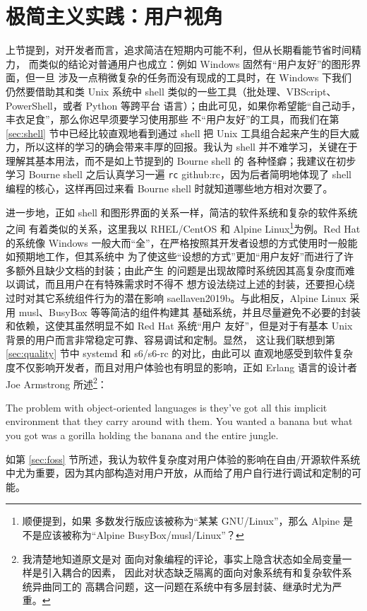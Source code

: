 \section{极简主义实践：用户视角}\label{sec:user}

上节提到，对开发者而言，追求简洁在短期内可能不利，但从长期看能节省时间精力，
而类似的结论对普通用户也成立：例如 Windows 固然有“用户友好”的图形界面，但一旦
涉及一点稍微复杂的任务而没有现成的工具时，在 Windows 下我们仍然要借助其和类 Unix
系统中 shell 类似的一些工具（批处理、VBScript、PowerShell，或者 Python 等跨平台
语言）；由此可见，如果你希望能“自己动手，丰衣足食”，那么你迟早须要学习使用那些
不“用户友好”的工具，而我们在第 \ref{sec:shell} 节中已经比较直观地看到通过 shell
把 Unix 工具组合起来产生的巨大威力，所以这样的学习的确会带来丰厚的回报。我认为
shell 并不难学习，关键在于理解其基本用法，而不是如上节提到的 Bourne shell 的
各种怪癖；我建议在初步学习 Bourne shell 之后认真学习一遍 \verb|rc|\cupercite%
{github:rc}，因为后者简明地体现了 shell 编程的核心，这样再回过来看
Bourne shell 时就知道哪些地方相对次要了。

进一步地，正如 shell 和图形界面的关系一样，简洁的软件系统和复杂的软件系统之间
有着类似的关系，这里我以 RHEL/CentOS 和 Alpine Linux\footnote{顺便提到，如果
多数发行版应该被称为“某某 GNU/Linux”，那么 Alpine
是不是应该被称为“Alpine BusyBox/musl/Linux”？}为例。Red Hat 的系统像 Windows
一般大而“全”，在严格按照其开发者设想的方式使用时一般能如预期地工作，但其系统中
为了使这些“设想的方式”更加“用户友好”而进行了许多额外且缺少文档的封装；由此产生
的问题是出现故障时系统因其高复杂度而难以调试，而且用户在有特殊需求时不得不
想方设法绕过上述的封装，还要担心绕过时对其它系统组件行为的潜在影响\cupercite%
{saellaven2019b}。与此相反，Alpine Linux 采用 musl、BusyBox 等等简洁的组件构建其
基础系统，并且尽量避免不必要的封装和依赖，这使其虽然明显不如 Red Hat 系统“用户
友好”，但是对于有基本 Unix 背景的用户而言非常稳定可靠、容易调试和定制。显然，
这让我们联想到第 \ref{sec:quality} 节中 systemd 和 s6/s6-rc 的对比，由此可以
直观地感受到软件复杂度不仅影响开发者，而且对用户体验也有明显的影响，正如
Erlang 语言的设计者 Joe Armstrong 所述\footnote{我清楚地知道原文是对
面向对象编程的评论，事实上隐含状态如全局变量一样是引入耦合的因素，
因此对状态缺乏隔离的面向对象系统有和复杂软件系统异曲同工的
高耦合问题，这一问题在系统中有多层封装、继承时尤为严重。}：
\begin{quoting}
	The problem with object-oriented languages is they've got all this implicit
	environment that they carry around with them.  You wanted a banana but what
	you got was a gorilla holding the banana and the entire jungle.
\end{quoting}
如第 \ref{sec:foss} 节所述，我认为软件复杂度对用户体验的影响在自由/开源软件系统
中尤为重要，因为其内部构造对用户开放，从而给了用户自行进行调试和定制的可能。

